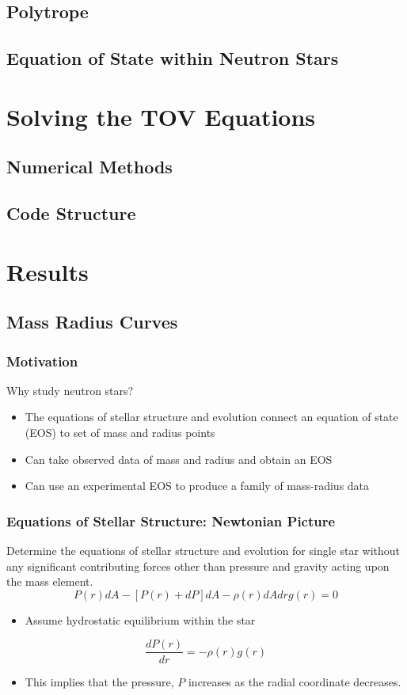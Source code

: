 \documentclass{beamer}
\begin{document}
\subsection{Polytrope}
\subsection{Equation of State within Neutron Stars}

\section{Solving the TOV Equations}
\subsection{Numerical Methods}
\subsection{Code Structure}

\section{Results}
\subsection{Mass Radius Curves}
\begin{frame}
\frametitle{Motivation}
Why study neutron stars?
\begin{itemize}
\item The equations of stellar structure and evolution connect an equation of state (EOS) to set of mass and radius points
\item Can take observed data of mass and radius and obtain an EOS
\item Can use an experimental EOS to produce a family of mass-radius data
\end{itemize}
\end{frame}
\begin{frame}
\frametitle{Equations of Stellar Structure: Newtonian Picture}
Determine the equations of stellar structure and evolution for single star without any significant contributing forces other than pressure and gravity acting upon the mass element.
\begin{equation}\label{eq:pda}
P(r) dA - [P(r) + dP]dA - \rho(r) dA dr g(r) = 0
\end{equation}
\begin{itemize} 
\item Assume hydrostatic equilibrium within the star
\end{itemize}
\begin{equation}\label{eq:hydro}
\frac{dP(r)}{dr} = -\rho(r) g(r)
\end{equation}
\begin{itemize}
\item This implies that the pressure, $P$ increases as the radial coordinate decreases.
\end{itemize}
\end{frame}
\end{document}
